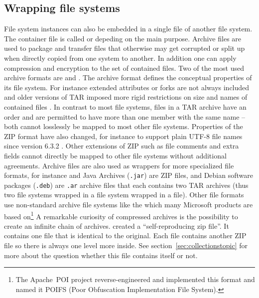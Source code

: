 \subsection{Wrapping file systems} \label{sec:archivfiles} File system
instances can also be embedded in a single file of another file system. The
container file is called  or  depeding on
the main purpose. Archive files are used to package and transfer files that
otherwise may get corrupted or split up when directly copied from one system to
another. In addition one can apply compression and encryption to the set of
contained files. Two of the most used archive formats are 
\cite{GNUtar} and  \cite{ZIP2007}. The archive format defines the
conceptual properties of its file system. For instance extended attributes or
forks are not always included and older versions of TAR imposed more rigid
restrictions on size and names of contained files \cite[section 8]{GNUtar}.  In
contrast to most file systems, files in a TAR archive have an order and are
permitted to have more than one member with the same name -- both cannot
losslessly be mapped to most other file systems. Properties of the ZIP format
have also changed, for instance to support plain UTF-8 file names since version
6.3.2 \cite{ZIP2007}. Other extensions of ZIP such as file comments and extra
fields cannot directly be mapped to other file systems without additional
agreements. Archive files are also used as wrappers for more specialized file
formats, for instance  \cite{OpenDocument2012} and Java
Archives (\texttt{.jar}) are ZIP files, and Debian software packages
(\texttt{.deb}) are \texttt{.ar} archive files that each contains two TAR
archives (thus two file systems wrapped in a file system wrapped in a file).
Other file formats use non-standard archive file systems like the
 which many Microsoft products are based
on\footnote{The Apache~POI project reverse-engineered and implemented this
format and named it POIFS (Poor Obfuscation Implementation File System).} %
A remarkable curiosity of compressed archives is the possibility to create an
infinite chain of archives. \textcite{Cox2010} created a ``self-reproducing zip
file''. It contains one file that is identical to the original. Each file
contains another ZIP file so there is always one level more inside. See
section~\ref{sec:collectionstopic} for more about the question whether this
file contains itself or not.  \label{p:zipfile}

